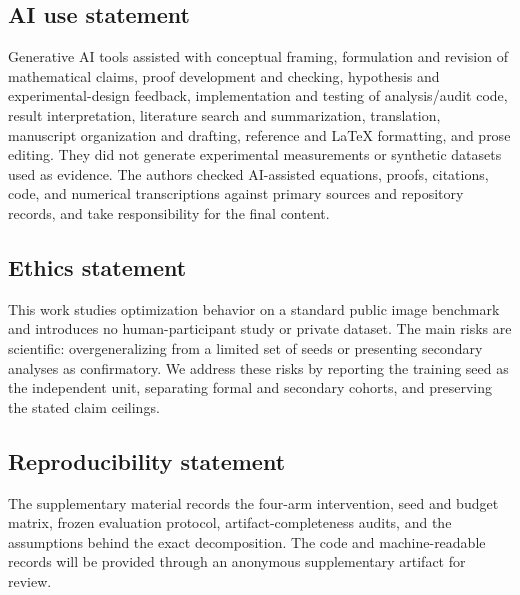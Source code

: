 \documentclass{article}
\newif\ifshowcomments
\newcommand{\todo}[1]{%
  \ifshowcomments{\color{todored}\textbf{[TODO: #1]}}\fi}
\begin{document}
\subsection*{AI use statement}

Generative AI tools assisted with conceptual framing, formulation and revision
of mathematical claims, proof development and checking, hypothesis and
experimental-design feedback, implementation and testing of analysis/audit
code, result interpretation, literature search and summarization, translation,
manuscript organization and drafting, reference and LaTeX formatting, and
prose editing. They did not generate experimental measurements or synthetic
datasets used as evidence. The authors checked AI-assisted equations, proofs,
citations, code, and numerical transcriptions against primary sources and
repository records, and take responsibility for the final content.

\todo{All authors must review this required ICLR 2027 disclosure and add any
other reportable AI uses before submission.}

\subsection*{Ethics statement}

This work studies optimization behavior on a standard public image benchmark
and introduces no human-participant study or private dataset. The main risks
are scientific: overgeneralizing from a limited set of seeds or presenting
secondary analyses as confirmatory. We address these risks by reporting the
training seed as the independent unit, separating formal and secondary cohorts,
and preserving the stated claim ceilings.

\subsection*{Reproducibility statement}

The supplementary material records the four-arm intervention, seed and budget
matrix, frozen evaluation protocol, artifact-completeness audits, and the
assumptions behind the exact decomposition. The code and machine-readable
records will be provided through an anonymous supplementary artifact for
review.

\todo{Create and verify the anonymous artifact URL; do not link an
identity-revealing repository in the double-blind submission.}



\end{document}
